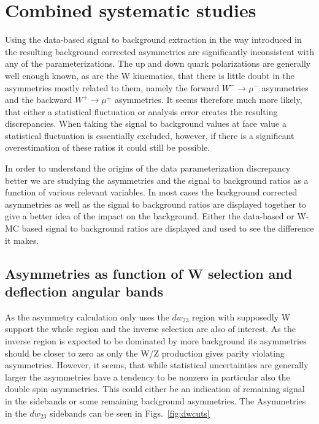 \section{Combined systematic studies}
Using the data-based signal to background extraction in the way introduced in
\cite{Oide2012} the resulting background corrected asymmetries are significantly
inconsistent with any of the parameterizations. The up and down quark
polarizations are generally well enough known, as are the W kinematics, that
there is little doubt in the asymmetries mostly related to them, namely the
forward $W^-\rightarrow \mu^-$ asymmetries and the backward
$W^+\rightarrow\mu^+$ asymmetries. It seems therefore much more likely, that
either a statistical fluctuation or analysis error creates the resulting
discrepancies. When taking the signal to background values at face value a
statistical fluctuation is essentially excluded, however, if there is a
significant overestimation of these ratios it could still be possible. 

In order to understand the origins of the data parameterization discrepancy
better we are studying the asymmetries and the signal to background ratios as a
function of various relevant variables. In most cases the background corrected
asymmetries as well as the signal to background ratios are displayed together to
give a better idea of the impact on the background. Either the data-based or
W-MC based signal to background ratios are displayed and used to see the
difference it makes.

\subsection{Asymmetries as function of W selection and deflection angular bands}

As the asymmetry calculation only uses the $dw_{23}$ region with supposedly W support
the whole region and the inverse selection are also of interest. As the inverse
region is expected to be dominated by more background its asymmetries should be
closer to zero as only the W/Z production gives parity violating asymmetries.
However, it seems, that while statistical uncertainties are generally larger the
asymmetries have a tendency to be nonzero in particular also the double spin
asymmetries. This could either be an indication of remaining signal in the
sidebands or some remaining background asymmetries. The Asymmetries in the
$dw_{23}$ sidebands can be seen in Figs.~\ref{fig:dwcuts}

